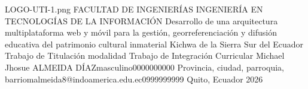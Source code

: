 \documentclass[12pt,a4paper,oneside]{report}
\begin{document}
{LOGO-UTI-1.png} %
{FACULTAD DE INGENIERÍAS} %
{INGENIERÍA EN TECNOLOGÍAS DE LA INFORMACIÓN} %
{Desarrollo de una arquitectura multiplataforma web y móvil para la gestión, georreferenciación y difusión educativa del patrimonio cultural inmaterial Kichwa de la Sierra Sur del Ecuador} %
{Trabajo de Titulación modalidad Trabajo de Integración Curricular} %
{\UTIDatosAutores
  {Michael Jhosue ALMEIDA DÍAZ}{masculino}{0000000000}
  {Provincia, ciudad, parroquia, barrio}{malmeida8@indoamerica.edu.ec}{0999999999}} %
{} %
{Quito, Ecuador} %
{2026} %

\UTIFrontMatter


















\UTIMainMatter
\end{document}
